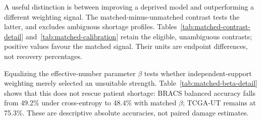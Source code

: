 \noindent A useful distinction is between improving a deprived model and outperforming a different weighting signal. The matched-minus-unmatched contrast tests the latter, and excludes ambiguous shortage profiles. Tables~\ref{tab:matched-contrast-detail} and~\ref{tab:matched-calibration} retain the eligible, unambiguous contrasts; positive values favour the matched signal. Their units are endpoint differences, not recovery percentages.

\begin{table}[H]
\centering\footnotesize\setlength{\tabcolsep}{3pt}

\caption{Matched-minus-unmatched balanced accuracy in percentage points. Intervals are paired bootstrap 95\% intervals; $p$-values use the confirmatory Holm adjustment.}
\label{tab:matched-contrast-detail}
\end{table}
\begin{table}[H]
\centering\footnotesize\setlength{\tabcolsep}{3pt}

\caption{Matched-minus-unmatched probability quality in nats, oriented so positive favours the matched signal. Ambiguous profiles are excluded.}
\label{tab:matched-calibration}
\end{table}

\noindent Equalizing the effective-number parameter $\beta$ tests whether independent-support weighting merely selected an unsuitable strength. Table~\ref{tab:matched-beta-detail} shows that this does not rescue patient shortage: BRACS balanced accuracy falls from 49.2\% under cross-entropy to 48.4\% with matched $\beta$; TCGA-UT remains at 75.3\%. These are descriptive absolute accuracies, not paired damage estimates.
\begin{table}[H]
\centering\footnotesize\setlength{\tabcolsep}{4pt}

\caption{Balanced accuracy (\%) under cross-entropy, tuned independent-support weighting, independent-support weighting at nominal-support's selected $\beta$, and nominal-support weighting.}
\label{tab:matched-beta-detail}
\end{table}

